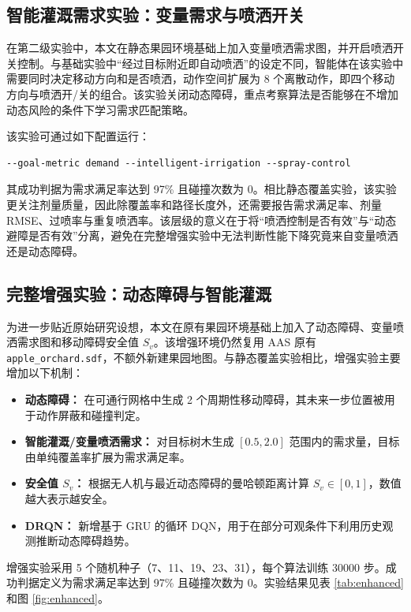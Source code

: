 \documentclass[UTF8]{ctexart}
\begin{document}
\subsection{智能灌溉需求实验：变量需求与喷洒开关}

在第二级实验中，本文在静态果园环境基础上加入变量喷洒需求图，并开启喷洒开关控制。与基础实验中“经过目标附近即自动喷洒”的设定不同，智能体在该实验中需要同时决定移动方向和是否喷洒，动作空间扩展为 8 个离散动作，即四个移动方向与喷洒开/关的组合。该实验关闭动态障碍，重点考察算法是否能够在不增加动态风险的条件下学习需求匹配策略。

该实验可通过如下配置运行：
\begin{verbatim}
--goal-metric demand --intelligent-irrigation --spray-control
\end{verbatim}
其成功判据为需求满足率达到 97\% 且碰撞次数为 0。相比静态覆盖实验，该实验更关注剂量质量，因此除覆盖率和路径长度外，还需要报告需求满足率、剂量 RMSE、过喷率与重复喷洒率。该层级的意义在于将“喷洒控制是否有效”与“动态避障是否有效”分离，避免在完整增强实验中无法判断性能下降究竟来自变量喷洒还是动态障碍。

\subsection{完整增强实验：动态障碍与智能灌溉}

为进一步贴近原始研究设想，本文在原有果园环境基础上加入了动态障碍、变量喷洒需求图和移动障碍安全值 $S_v$。该增强环境仍然复用 AAS 原有 \texttt{apple\_orchard.sdf}，不额外新建果园地图。与静态覆盖实验相比，增强实验主要增加以下机制：
\begin{itemize}
  \item \textbf{动态障碍：} 在可通行网格中生成 2 个周期性移动障碍，其未来一步位置被用于动作屏蔽和碰撞判定。
  \item \textbf{智能灌溉/变量喷洒需求：} 对目标树木生成 $[0.5,2.0]$ 范围内的需求量，目标由单纯覆盖率扩展为需求满足率。
  \item \textbf{安全值 $S_v$：} 根据无人机与最近动态障碍的曼哈顿距离计算 $S_v\in[0,1]$，数值越大表示越安全。
  \item \textbf{DRQN：} 新增基于 GRU 的循环 DQN，用于在部分可观条件下利用历史观测推断动态障碍趋势。
\end{itemize}

增强实验采用 5 个随机种子（7、11、19、23、31），每个算法训练 30000 步。成功判据定义为需求满足率达到 97\% 且碰撞次数为 0。实验结果见表 \ref{tab:enhanced} 和图 \ref{fig:enhanced}。
\end{document}
